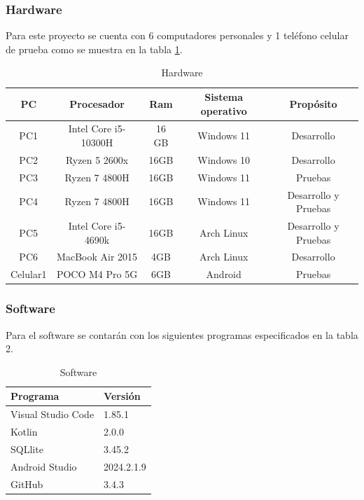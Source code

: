 \documentclass[letterpaper, 10pt]{article}
\begin{document}
\subsubsection{Hardware}
Para este proyecto se cuenta con 6 computadores personales y 1 teléfono celular de prueba como se muestra en la tabla 
\ref{table:1}.
\begin{table}[H]
    \centering
    \caption{Hardware}
	\vspace{0.2cm}
    \begin{tabular}{|c|c|c|c|c|} \hline
        \textbf{PC} & \textbf{Procesador} & \textbf{Ram} & \textbf{Sistema operativo} & \textbf{Propósito}  \\ \hline
         PC1 & Intel Core i5-10300H       & 16 GB        & Windows 11 & Desarrollo \\\hline
         PC2 & Ryzen 5 2600x       &  16GB      & Windows 10 & Desarrollo\\\hline
         PC3 & Ryzen 7 4800H       &  16GB      & Windows 11  & Pruebas\\\hline
         PC4 & Ryzen 7 4800H       &  16GB      & Windows 11 & Desarrollo y Pruebas\\\hline
		 PC5 & Intel Core i5-4690k &  16GB		& Arch Linux & Desarrollo y Pruebas\\\hline
		 PC6 & MacBook Air 2015	   &  4GB		& Arch Linux & Desarrollo\\\hline
		 Celular1 &	POCO M4 Pro 5G &  6GB		& Android	 & Pruebas\\\hline
    \end{tabular}
    
    \label{table:1}
\end{table}
\newpage
\subsubsection{Software}
Para el software se contarán con los siguientes programas especificados en la tabla 2.
\begin{table}[H]
    \centering
    \caption{Software}
	\vspace{0.2cm}
    \begin{tabular}{|l|l|} \hline
        \textbf{Programa} & \textbf{Versión} \\ \hline
         Visual Studio Code & 1.85.1\\\hline
         Kotlin & 2.0.0 \\\hline
         SQLlite &  3.45.2\\\hline
         Android Studio &  2024.2.1.9\\\hline
         GitHub &  3.4.3 \\\hline
    \end{tabular}
    \label{table:2}
\end{table}
\end{document}
